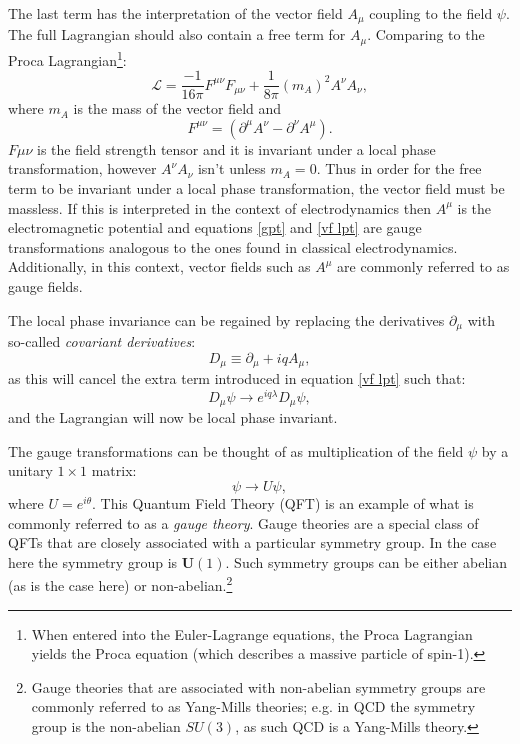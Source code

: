 The last term has the interpretation of the vector field $A_{\mu}$ coupling to the field $\psi$. The full Lagrangian should also contain a free term for $A_{\mu}$. Comparing to the Proca Lagrangian\footnote{When entered into the Euler-Lagrange equations, the Proca Lagrangian yields the Proca equation (which describes a massive particle of spin-1).}:
\begin{equation}
\mathcal{L} = \frac{-1}{16 \pi} F^{\mu \nu} F_{\mu \nu} + \frac{1}{8 \pi} \left( m_{A} \right)^{2} A^{\nu} A_{\nu},
\end{equation}
where $m_{A}$ is the mass of the vector field and 
\begin{equation}
F^{\mu \nu} = \left( \partial^{\mu} A^{\nu} - \partial^{\nu} A^{\mu} \right).
\end{equation}
$F{\mu \nu}$ is the field strength tensor and it is invariant under a local phase transformation, however $A^{\nu}A_{\nu}$ isn't unless $m_{A} = 0$. Thus in order for the free term to be invariant under a local phase transformation, the vector field must be massless. If this is interpreted in the context of electrodynamics then $A^{\mu}$ is the electromagnetic potential and equations \ref{gpt} and \ref{vf lpt} are gauge transformations analogous to the ones found in classical electrodynamics. Additionally, in this context, vector fields such as $A^{\mu}$ are commonly referred to as gauge fields.

The local phase invariance can be regained by replacing the derivatives $\partial_{\mu}$ with so-called \emph{covariant derivatives}:
\begin{equation}
D_{\mu} \equiv \partial_{\mu} + iqA_{\mu},
\end{equation}
as this will cancel the extra term introduced in equation \ref{vf lpt} such that:
\begin{equation}
D_{\mu} \psi \longrightarrow e^{iq \lambda} D_{\mu} \psi,
\end{equation}
and the Lagrangian will now be local phase invariant.

The gauge transformations can be thought of as multiplication of the field $\psi$ by a unitary $1 \times 1$ matrix:
\begin{equation}
\psi \longrightarrow U \psi,
\end{equation}
where $ U = e^{i \theta}$. This Quantum Field Theory (QFT) is an example of what is commonly referred to as a \emph{gauge theory}. Gauge theories are a special class of QFTs that are closely associated with a particular symmetry group. In the case here the symmetry group is $\mathbf{U}(1)$. Such symmetry groups can be either abelian (as is the case here) or non-abelian.\footnote{Gauge theories that are associated with non-abelian symmetry groups are commonly referred to as Yang-Mills theories; e.g. in QCD the symmetry group is the non-abelian $SU(3)$, as such QCD is a Yang-Mills theory.}

